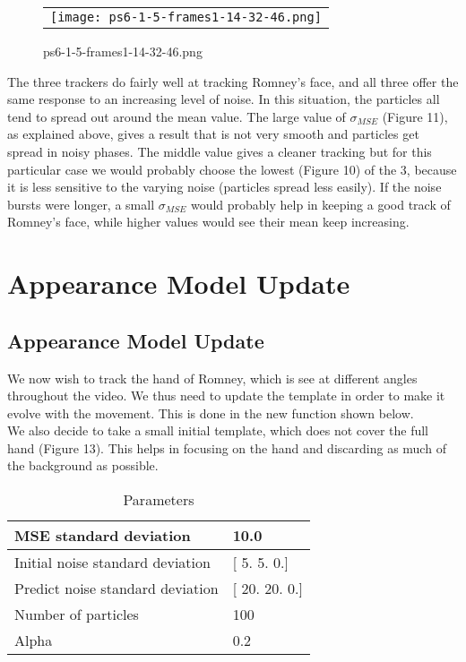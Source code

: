\documentclass[a4paper,11pt]{article}
\begin{document}
\begin{figure}[H]
\begin{center}
\begin{tabular}{c}
	\texttt{[image: ps6-1-5-frames1-14-32-46.png]}\\
\end{tabular}
\end{center}
\caption{ps6-1-5-frames1-14-32-46.png}
\label{ps-6-5-b}
\end{figure}

The three trackers do fairly well at tracking Romney's face, and all three offer the same response to an increasing level of noise. In this situation, the particles all tend to spread out around the mean value.
The large value of $\sigma_{MSE}$ (Figure 11), as explained above, gives a result that is not very smooth and particles get spread in noisy phases. The middle value gives a cleaner tracking but for this particular case we would probably choose the lowest (Figure 10) of the 3, because it is less sensitive to the varying noise (particles spread less easily).
If the noise bursts were longer, a small $\sigma_{MSE}$ would probably help in keeping a good track of Romney's face, while higher values would see their mean keep increasing.


\section{Appearance Model Update}

\subsection{Appearance Model Update}

We now wish to track the hand of Romney, which is see at different angles throughout the video. We thus need to update the template in order to make it evolve with the movement. This is done in the new function shown below.\\

We also decide to take a small initial template, which does not cover the full hand (Figure 13). This helps in focusing on the hand and discarding as much of the background as possible.

\begin{table}[H]
\centering
\caption{Parameters}
\begin{tabular}{|l|l|}
\hline
    MSE standard deviation   &   10.0 \\ \hline
    Initial noise standard deviation &  [ 5.  5.  0.] \\ \hline
    Predict noise standard deviation &  [ 20.  20.  0.] \\ \hline
    Number of particles &  100 \\ \hline
    Alpha   & 0.2\\ \hline
\end{tabular}
\end{table}
\end{document}
